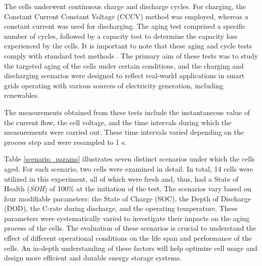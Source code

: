 \documentclass[energies,article,accept,pdftex,moreauthors]{Definitions/mdpi}
\begin{document}
The cells underwent continuous charge and discharge cycles. For charging, the Constant Current Constant Voltage (CCCV) method was employed, whereas a constant current was used for discharging. The aging test comprised a specific number of cycles, followed by a capacity test to determine the capacity loss experienced by the cells. It is important to note that these aging and cycle tests comply with standard test methods \cite{Kassem.2012}. The primary aim of these tests was to study the targeted aging of the cells under certain conditions, and the charging and discharging scenarios were designed to reflect real-world applications in smart grids operating with various sources of electricity generation, including renewables.

The measurements obtained from these tests include the instantaneous value of the current flow, the cell voltage, and the time intervals during which the measurements were carried out. These time intervals varied depending on the process step and were resampled to 1 s.

Table \ref{scenario_params} illustrates seven distinct scenarios under which the cells aged. For each scenario, two cells were examined in detail. In total, 14 cells were utilized in this experiment, all of which were fresh and, thus, had a State of Health (\textit{SOH}) of 100\% at the initiation of the test. The scenarios vary based on four modifiable parameters: the State of Charge (SOC), the Depth of Discharge (DOD), the C-rate during discharge, and the operating temperature. These parameters were systematically varied to investigate their impacts on the aging process of the cells. The evaluation of these scenarios is crucial to understand the effect of different operational conditions on the life span and performance of the cells. An in-depth understanding of these factors will help optimize cell usage and design more efficient and durable energy storage systems.
\end{document}
